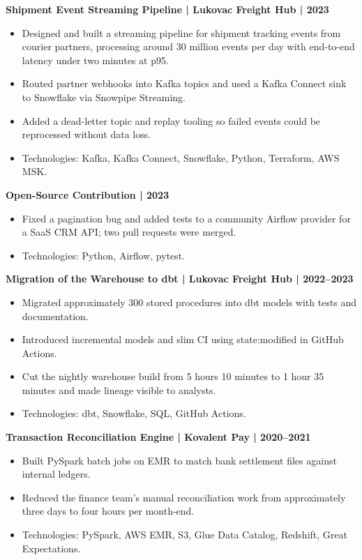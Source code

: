 \documentclass[11pt,a4paper]{article}
\begin{document}
\textbf{Shipment Event Streaming Pipeline | Lukovac Freight Hub | 2023}
\begin{itemize}
\item Designed and built a streaming pipeline for shipment tracking events from courier partners, processing around 30 million events per day with end-to-end latency under two minutes at p95.
\item Routed partner webhooks into Kafka topics and used a Kafka Connect sink to Snowflake via Snowpipe Streaming.
\item Added a dead-letter topic and replay tooling so failed events could be reprocessed without data loss.
\item Technologies: Kafka, Kafka Connect, Snowflake, Python, Terraform, AWS MSK.
\end{itemize}

\textbf{Open-Source Contribution | 2023}
\begin{itemize}
\item Fixed a pagination bug and added tests to a community Airflow provider for a SaaS CRM API; two pull requests were merged.
\item Technologies: Python, Airflow, pytest.
\end{itemize}

\textbf{Migration of the Warehouse to dbt | Lukovac Freight Hub | 2022–2023}
\begin{itemize}
\item Migrated approximately 300 stored procedures into dbt models with tests and documentation.
\item Introduced incremental models and slim CI using state:modified in GitHub Actions.
\item Cut the nightly warehouse build from 5 hours 10 minutes to 1 hour 35 minutes and made lineage visible to analysts.
\item Technologies: dbt, Snowflake, SQL, GitHub Actions.
\end{itemize}

\textbf{Transaction Reconciliation Engine | Kovalent Pay | 2020–2021}
\begin{itemize}
\item Built PySpark batch jobs on EMR to match bank settlement files against internal ledgers.
\item Reduced the finance team's manual reconciliation work from approximately three days to four hours per month-end.
\item Technologies: PySpark, AWS EMR, S3, Glue Data Catalog, Redshift, Great Expectations.
\end{itemize}
\end{document}

